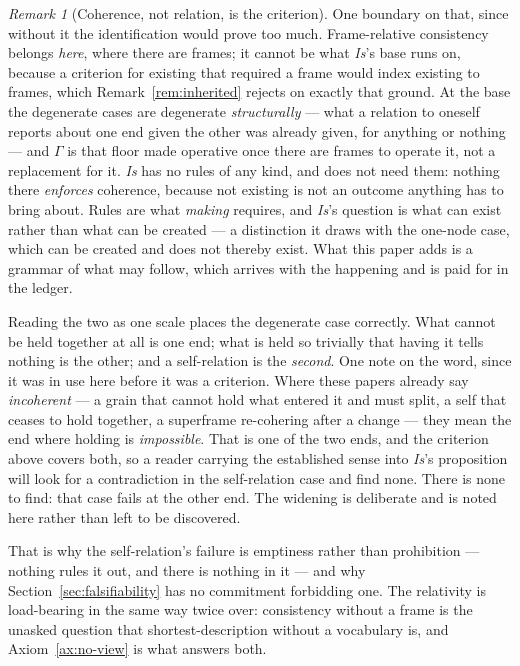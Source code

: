 \documentclass[11pt,a4paper]{article}
\theoremstyle{remark}\newtheorem{remark}[definition]{Remark}
\begin{document}
\begin{remark}[Coherence, not relation, is the criterion]
One boundary on that, since without it the identification would prove too much. Frame-relative
consistency belongs \emph{here}, where there are frames; it cannot be what \emph{Is}'s base runs on,
because a criterion for existing that required a frame would index existing to frames, which
Remark~\ref{rem:inherited} rejects on exactly that ground. At the base the degenerate cases are
degenerate \emph{structurally} --- what a relation to oneself reports about one end given the other was
already given, for anything or nothing --- and $\Gamma$ is that floor made operative once there are
frames to operate it, not a replacement for it. \emph{Is} has no rules of any kind, and does not need them: nothing there \emph{enforces} coherence,
because not existing is not an outcome anything has to bring about. Rules are what \emph{making}
requires, and \emph{Is}'s question is what can exist rather than what can be created --- a
distinction it draws with the one-node case, which can be created and does not thereby exist. What this
paper adds is a grammar of what may follow, which arrives with the happening and is paid for in the
ledger.

Reading the two as one scale places the degenerate case correctly. What cannot be held together at all
is one end; what is held so trivially that having it tells nothing is the other; and a self-relation is
the \emph{second}. One note on the word, since it was in use here before it was a criterion. Where these papers already
say \emph{incoherent} --- a grain that cannot hold what entered it and must split, a self that ceases
to hold together, a superframe re-cohering after a change --- they mean the end where holding is
\emph{impossible}. That is one of the two ends, and the criterion above covers both, so a reader
carrying the established sense into \emph{Is}'s proposition will look for a contradiction in the
self-relation case and find none. There is none to find: that case fails at the other end. The
widening is deliberate and is noted here rather than left to be discovered.

That is why the self-relation's failure is emptiness rather than prohibition --- nothing rules it
out, and there is nothing in it --- and why Section~\ref{sec:falsifiability} has no commitment
forbidding one. The relativity is load-bearing in the same way twice over: consistency without a
frame is the unasked question that shortest-description without a vocabulary is, and Axiom~\ref{ax:no-view} is what
answers both.
\end{remark}
\end{document}

